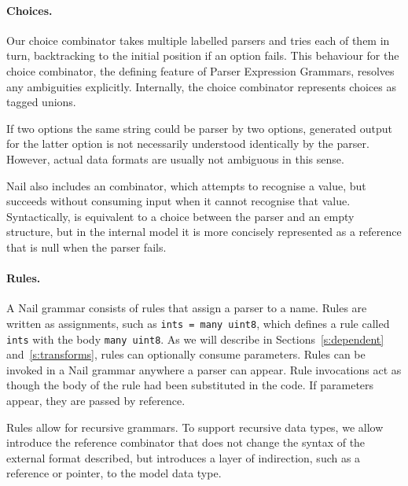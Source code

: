 \paragraph{Choices.}
Our choice combinator takes multiple labelled parsers and tries each of them in turn, backtracking
to the initial position if an option fails. This behaviour for the choice combinator, the defining
feature of Parser Expression Grammars\cite{ford2002packrat}, resolves any ambiguities explicitly.
Internally, the choice combinator represents choices as tagged unions. 

If two options the same string could be parser by two options, generated output for the latter
option is not necessarily understood identically by the parser. However, actual data formats are
usually not ambiguous in this sense.


Nail also includes an  combinator, which attempts to recognise a value, but succeeds
without consuming input when it cannot recognise that value. Syntactically,  is
equivalent to a choice between the parser and an empty structure, but in the internal model it is
more concisely represented as a reference that is null when the parser fails.

\paragraph{Rules.}
A Nail grammar consists of rules that assign a parser to a name. Rules are written as
assignments, such as \texttt{ints = many uint8}, which defines a rule called \texttt{ints} with the
body \texttt{many uint8}.  As we will describe in Sections~\ref{s:dependent}
and~\ref{s:transforms}, rules can optionally consume parameters. 
Rules can be invoked in a Nail grammar anywhere a parser can appear. Rule invocations act as though
the body of the rule had been substituted in the code. If parameters appear, they are passed by reference.

Rules allow for recursive grammars. To support recursive data types, we allow introduce the
reference combinator \cc{*}  that does not change the syntax of the external format described, but
introduces a layer of indirection, such as a reference or pointer, to the model data type.




